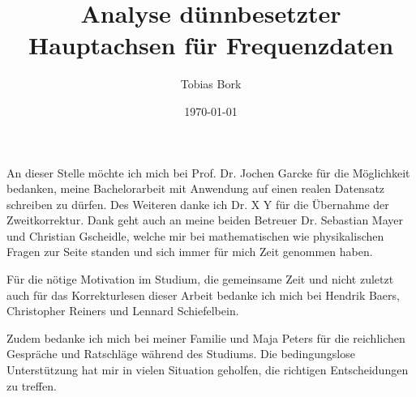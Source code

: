 \documentclass[
11pt, %
ngerman, %
singlespacing, %
parskip, %
headsepline, %
]{MastersDoctoralThesis} %
\author{Tobias Bork}
\date{\today}
\title{Analyse dünnbesetzter Hauptachsen für Frequenzdaten}
\theoremstyle{plain}
\theoremstyle{definition}
\begin{document}
\frontmatter %

\pagestyle{plain} %


\maketitle


\frontmatter
{}
\addtocounter{page}{2}

\begin{acknowledgements}
\addchaptertocentry{\acknowledgementname} %
\vspace{1.5cm}
An dieser Stelle möchte ich mich bei Prof. Dr. Jochen Garcke für die Möglichkeit bedanken, meine Bachelorarbeit mit Anwendung auf einen realen Datensatz schreiben zu dürfen. Des Weiteren danke ich Dr. X Y für die Übernahme der Zweitkorrektur. Dank geht auch an meine beiden Betreuer Dr. Sebastian Mayer und Christian Gscheidle, welche mir bei mathematischen wie physikalischen Fragen zur Seite standen und sich immer für mich Zeit genommen haben.

Für die nötige Motivation im Studium, die gemeinsame Zeit und nicht zuletzt auch für das Korrekturlesen dieser Arbeit bedanke ich mich bei Hendrik Baers, Christopher Reiners und Lennard Schiefelbein.

Zudem bedanke ich mich bei meiner Familie und Maja Peters für die reichlichen Gespräche und Ratschläge während des Studiums. Die bedingungslose Unterstützung hat mir in vielen Situation geholfen, die richtigen Entscheidungen zu treffen. 

\end{acknowledgements}

\restoregeometry

\end{document}
